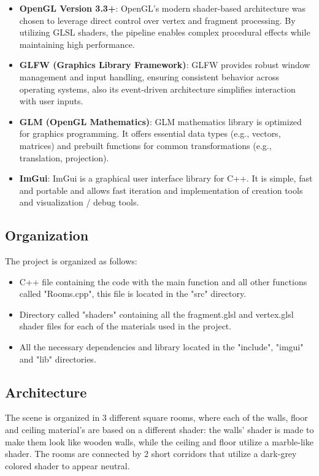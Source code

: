 \documentclass[12pt]{article}
\begin{document}
\begin{itemize}
    \item \textbf{OpenGL Version 3.3+}:
    \newline
    OpenGL's modern shader-based architecture was chosen to leverage direct control over vertex and fragment processing. By utilizing GLSL shaders, the pipeline enables complex procedural effects while maintaining high performance.

    \item \textbf{GLFW (Graphics Library Framework)}:
    \newline
    GLFW provides robust window management and input handling, ensuring consistent behavior across operating systems, also its event-driven architecture simplifies interaction with user inputs.

    \item \textbf{GLM (OpenGL Mathematics)}:
    \newline
    GLM mathematics library is optimized for graphics programming. It offers essential data types (e.g., vectors, matrices) and prebuilt functions for common transformations (e.g., translation, projection).

    \item \textbf{ImGui}:
    \newline
    ImGui is a graphical user interface library for C++. It is simple, fast and portable and allows fast iteration and implementation of creation tools and visualization / debug tools.
\end{itemize}

\subsection {Organization}
The project is organized as follows:
\begin{itemize}
    \item C++ file containing the code with the main function and all other functions called "Rooms.cpp", this file is located in the "src" directory.
    \item Directory called "shaders" containing all the fragment.glsl and vertex.glsl shader files for each of the materials used in the project.
    \item All the necessary dependencies and library located in the "include", "imgui" and "lib" directories.
\end{itemize}

\newpage

\subsection{Architecture}
The scene is organized in 3 different square rooms, where each of the walls, floor and ceiling material's are based on a different shader: the walls' shader is made to make them look like wooden walls, while the ceiling and floor utilize a marble-like shader. The rooms are connected by 2 short corridors that utilize a dark-grey colored shader to appear neutral.
\end{document}
